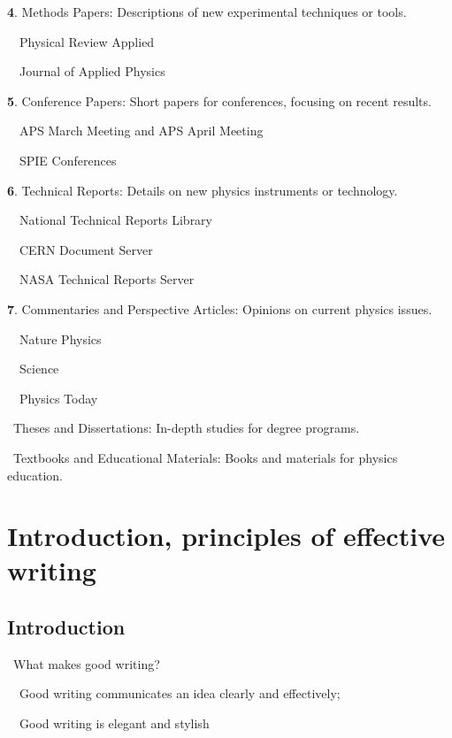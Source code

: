\documentclass[a4paper, 12pt]{article}
\begin{document}
\vspace{4pt}\textbf{4}. Methods Papers: Descriptions of new experimental techniques or tools.
\par\ \textopenbullet\ Physical Review Applied
\par\ \textopenbullet\ Journal of Applied Physics

\vspace{4pt}\textbf{5}. Conference Papers: Short papers for conferences, focusing on recent results.
\par\ \textopenbullet\ APS March Meeting and APS April Meeting
\par\ \textopenbullet\ SPIE Conferences

\vspace{4pt}\textbf{6}. Technical Reports: Details on new physics instruments or technology.
\par\ \textopenbullet\ National Technical Reports Library
\par\ \textopenbullet\ CERN Document Server
\par\ \textopenbullet\ NASA Technical Reports Server

\vspace{4pt}\textbf{7}. Commentaries and Perspective Articles: Opinions on current physics issues.
\par\ \textopenbullet\ Nature Physics
\par\ \textopenbullet\ Science
\par\ \textopenbullet\ Physics Today

\par\textbullet\ Theses and Dissertations: In-depth studies for degree programs.
\par\textbullet\ Textbooks and Educational Materials: Books and materials for physics education.

\newpage\section{Introduction, principles of effective writing}

\subsection{Introduction}

\par\textbullet\ What makes good writing?
\par\ \textopenbullet\ Good writing communicates an idea clearly and effectively;
\par\ \textopenbullet\ Good writing is elegant and stylish
\end{document}
